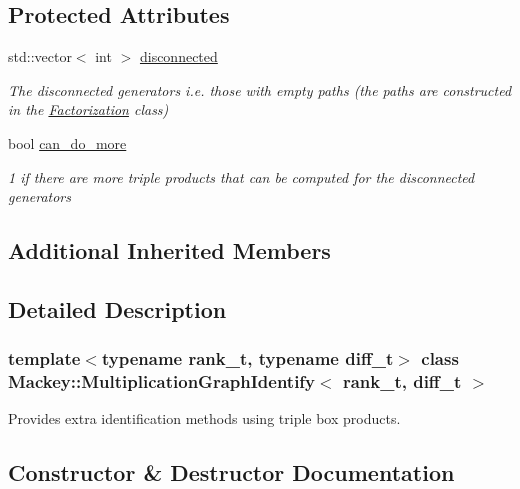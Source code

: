 \subsection*{Protected Attributes}
\begin{DoxyCompactItemize}
\item 
std\+::vector$<$ int $>$ \hyperlink{classMackey_1_1MultiplicationGraphIdentify_a9063120241d724ba34a2f48f193ad2e2}{disconnected}
\begin{DoxyCompactList}\small\item\em The disconnected generators i.\+e. those with empty paths (the paths are constructed in the \hyperlink{classMackey_1_1Factorization}{Factorization} class) \end{DoxyCompactList}\item 
bool \hyperlink{classMackey_1_1MultiplicationGraphIdentify_a8356b59250ebac1ac30ebc7407bd352b}{can\+\_\+do\+\_\+more}
\begin{DoxyCompactList}\small\item\em 1 if there are more triple products that can be computed for the disconnected generators \end{DoxyCompactList}\end{DoxyCompactItemize}
\subsection*{Additional Inherited Members}


\subsection{Detailed Description}
\subsubsection*{template$<$typename rank\+\_\+t, typename diff\+\_\+t$>$\newline
class Mackey\+::\+Multiplication\+Graph\+Identify$<$ rank\+\_\+t, diff\+\_\+t $>$}

Provides extra identification methods using triple box products. 

\subsection{Constructor \& Destructor Documentation}
\mbox{\label{classMackey_1_1MultiplicationGraphIdentify_a14b3d3ea4be57324231fd206354fa627}} 
